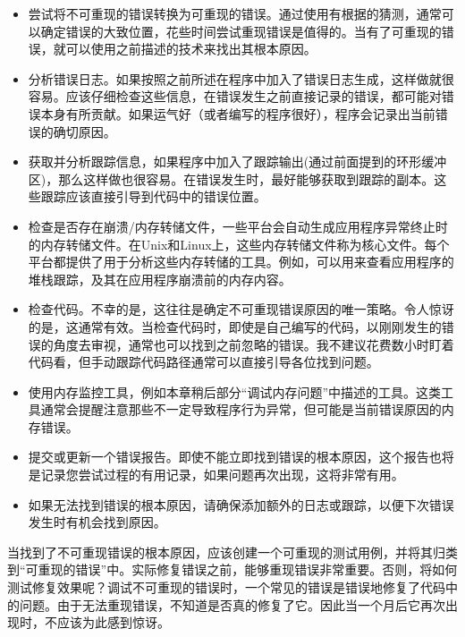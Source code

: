 \begin{itemize}
\item
尝试将不可重现的错误转换为可重现的错误。通过使用有根据的猜测，通常可以确定错误的大致位置，花些时间尝试重现错误是值得的。当有了可重现的错误，就可以使用之前描述的技术来找出其根本原因。

\item
分析错误日志。如果按照之前所述在程序中加入了错误日志生成，这样做就很容易。应该仔细检查这些信息，在错误发生之前直接记录的错误，都可能对错误本身有所贡献。如果运气好（或者编写的程序很好），程序会记录出当前错误的确切原因。

\item
获取并分析跟踪信息，如果程序中加入了跟踪输出(通过前面提到的环形缓冲区)，那么这样做也很容易。在错误发生时，最好能够获取到跟踪的副本。这些跟踪应该直接引导到代码中的错误位置。

\item
检查是否存在崩溃/内存转储文件，一些平台会自动生成应用程序异常终止时的内存转储文件。在Unix和Linux上，这些内存转储文件称为核心文件。每个平台都提供了用于分析这些内存转储的工具。例如，可以用来查看应用程序的堆栈跟踪，及其在应用程序崩溃前的内存内容。

\item
检查代码。不幸的是，这往往是确定不可重现错误原因的唯一策略。令人惊讶的是，这通常有效。当检查代码时，即使是自己编写的代码，以刚刚发生的错误的角度去审视，通常也可以找到之前忽略的错误。我不建议花费数小时盯着代码看，但手动跟踪代码路径通常可以直接引导各位找到问题。

\item
使用内存监控工具，例如本章稍后部分“调试内存问题”中描述的工具。这类工具通常会提醒注意那些不一定导致程序行为异常，但可能是当前错误原因的内存错误。

\item
提交或更新一个错误报告。即使不能立即找到错误的根本原因，这个报告也将是记录您尝试过程的有用记录，如果问题再次出现，这将非常有用。

\item
如果无法找到错误的根本原因，请确保添加额外的日志或跟踪，以便下次错误发生时有机会找到原因。
\end{itemize}

当找到了不可重现错误的根本原因，应该创建一个可重现的测试用例，并将其归类到“可重现的错误”中。实际修复错误之前，能够重现错误非常重要。否则，将如何测试修复效果呢？调试不可重现的错误时，一个常见的错误是错误地修复了代码中的问题。由于无法重现错误，不知道是否真的修复了它。因此当一个月后它再次出现时，不应该为此感到惊讶。

